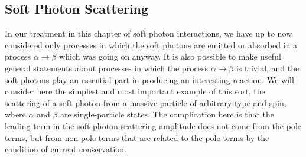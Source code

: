 
\subsection[Soft Photon Scattering]{Soft Photon Scattering\texorpdfstring{\protect\footnotemark}{}}

In our treatment in this chapter of soft photon interactions, we have up
to now considered only processes in which the soft photons are emitted
or absorbed in a process $\alpha\to\beta$ which was going on anyway. It is also
possible to make useful general statements about processes in which the
process $\alpha\to\beta$ is trivial, and the soft photons play an essential part in
producing an interesting reaction. We will consider here the simplest
and most important example of this sort, the scattering of a soft photon
from a massive particle of arbitrary type and spin, where $\alpha$ and $\beta$ are
single-particle states. The complication here is that the leading term in the
soft photon scattering amplitude does not come from the pole terms, but
from non-pole terms that are related to the pole terms by the condition
of current conservation.


